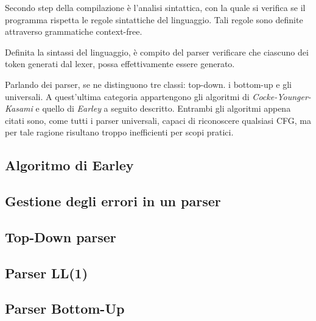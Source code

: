 \documentclass{subfiles}
\begin{document}
Secondo step della compilazione è l'analisi sintattica, con la quale si verifica se il programma rispetta le regole sintattiche del linguaggio.
Tali regole sono definite attraverso grammatiche context-free.

Definita la sintassi del linguaggio, è compito del parser verificare che ciascuno dei token generati dal lexer, possa effettivamente essere generato.

Parlando dei parser, se ne distinguono tre classi: top-down. i bottom-up e gli universali.
A quest'ultima categoria appartengono gli algoritmi di \emph{Cocke-Younger-Kasami} e quello di \emph{Earley} a seguito descritto.
Entrambi gli algoritmi appena citati sono, come tutti i parser universali, capaci di riconoscere qualsiasi CFG,
ma per tale ragione risultano troppo inefficienti per scopi pratici.

\subsection{Algoritmo di Earley}

\clearpage

\subsection{Gestione degli errori in un parser}


\subsection{Top-Down parser}

\clearpage

\subsection{Parser LL(1)}


\subsection{Parser Bottom-Up}

\end{document}

